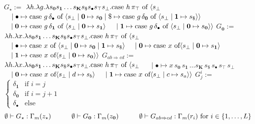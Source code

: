 \documentclass[10pt,a4paper]{amsart}
\begin{document}
    $\displaystyle G_{\star}:=$ $\displaystyle\lambda h.\lambda g.\lambda s_{\mathbf{0}}s_{\mathbf{1}}\ldots s_%
{\mathbf{K}}s_{\$}s_{\bullet}s_{\top}s_{\bot}.\textnormal{{case }}h\,\pi_{\top%
}\textnormal{{ of }}\langle s_{\bot}$      $\displaystyle\hskip 10.00002pt\mid\bullet\mapsto\textnormal{{case }}{g\,\delta%
_{\bullet}}\textnormal{{ of }}\langle s_{\bot}\mid\mathbf{0}\mapsto s_{\mathbf%
{0}}\mid\$\mapsto\textnormal{{case }}{g\,\delta_{\mathbf{0}}}\textnormal{{ of %
}}\langle s_{\bot}\mid\mathbf{1}\mapsto s_{\$}\rangle\rangle$      $\displaystyle\hskip 10.00002pt\mid\mathbf{0}\mapsto\textnormal{{case }}{g\,%
\delta_{\mathbf{1}}}\textnormal{{ of }}\langle s_{\bot}\mid\mathbf{0}\mapsto s%
_{\mathbf{1}}\rangle$      $\displaystyle\hskip 10.00002pt\mid\mathbf{1}\mapsto\textnormal{{case }}{g\,%
\delta_{\bullet}}\textnormal{{ of }}\langle s_{\bot}\mid\mathbf{0}\mapsto s_{%
\mathbf{0}}\rangle\rangle$     $\displaystyle G_{\mathbf{0}}:=$ $\displaystyle\lambda h.\lambda x.\lambda s_{\mathbf{0}}s_{\mathbf{1}}\ldots s_%
{\mathbf{K}}s_{\$}s_{\bullet}s_{\top}s_{\bot}.\textnormal{{case }}h\,\pi_{\top%
}\textnormal{{ of }}\langle s_{\bot}$      $\displaystyle\quad\mid\bullet\mapsto\textnormal{{case }}{x}\textnormal{{ of }}%
\langle s_{\bot}\mid\mathbf{0}\mapsto s_{\mathbf{0}}\mid\mathbf{1}\mapsto s_{%
\$}\rangle$      $\displaystyle\quad\mid\mathbf{0}\mapsto\textnormal{{case }}{x}\textnormal{{ of%
 }}\langle s_{\bot}\mid\mathbf{0}\mapsto s_{\mathbf{1}}\rangle$      $\displaystyle\quad\mid\mathbf{1}\mapsto\textnormal{{case }}{x}\textnormal{{ of%
 }}\langle s_{\bot}\mid\mathbf{0}\mapsto s_{\mathbf{0}}\rangle\rangle$     $\displaystyle G_{ab\Rightarrow cd}:=$ $\displaystyle\lambda h.\lambda x.\lambda s_{\mathbf{0}}s_{\mathbf{1}}\ldots s_%
{\mathbf{K}}s_{\$}s_{\bullet}s_{\top}s_{\bot}.\textnormal{{case }}h\,\pi_{\top%
}\textnormal{{ of }}\langle s_{\bot}$      $\displaystyle\quad\mid\bullet\mapsto x\,s_{\mathbf{0}}\,s_{\mathbf{1}}\,\ldots
s%
_{\mathbf{K}}\,s_{\$}\,s_{\bullet}\,s_{\top}\,s_{\bot}$      $\displaystyle\quad\mid\mathbf{0}\mapsto\textnormal{{case }}{x}\textnormal{{ of%
 }}\langle s_{\bot}\mid d\mapsto s_{b}\rangle$      $\displaystyle\quad\mid\mathbf{1}\mapsto\textnormal{{case }}{x}\textnormal{{ of%
 }}\langle s_{\bot}\mid c\mapsto s_{a}\rangle\rangle$     $\displaystyle G_{j}^{i}:=$ $\displaystyle\begin{cases}\delta_{\mathbf{1}}&\text{if }i=j\\
\delta_{\mathbf{0}}&\text{if }i=j+1\\
\delta_{\bullet}&\text{else}\end{cases}$       \[\emptyset\vdash G_{\star}:\Gamma_{m}(z_{\star})\qquad\quad\emptyset\vdash G_{%
\mathbf{0}}:\Gamma_{m}(z_{\mathbf{0}})\qquad\quad\emptyset\vdash G_{ab%
\Rightarrow cd}:\Gamma_{m}(r_{i})\text{ for }i\in\{1,\ldots,L\}\]    
 
\end{document}
